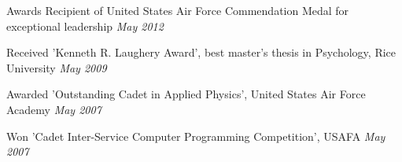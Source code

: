 
\begin{rSection}{Awards}
  Recipient of United States Air Force Commendation Medal for exceptional leadership \hfill {\em May 2012}
  \item Received 'Kenneth R. Laughery Award', best master’s thesis in Psychology, Rice University \hfill {\em May 2009}
  \item Awarded 'Outstanding Cadet in Applied Physics', United States Air Force Academy \hfill {\em May 2007}
  \item Won 'Cadet Inter-Service Computer Programming Competition', USAFA \hfill {\em May 2007}
\end{rSection}

